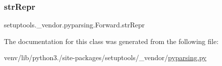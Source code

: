 \mbox{\label{classsetuptools_1_1__vendor_1_1pyparsing_1_1Forward_ad66d918d824383a59eb3e18c2c454b67}} 
\subsubsection{\texorpdfstring{str\+Repr}{strRepr}}
{\footnotesize\ttfamily setuptools.\+\_\+vendor.\+pyparsing.\+Forward.\+str\+Repr}



The documentation for this class was generated from the following file\+:\begin{DoxyCompactItemize}
\item 
venv/lib/python3./site-\/packages/setuptools/\+\_\+vendor/\hyperlink{setuptools_2__vendor_2pyparsing_8py}{pyparsing.\+py}\end{DoxyCompactItemize}
